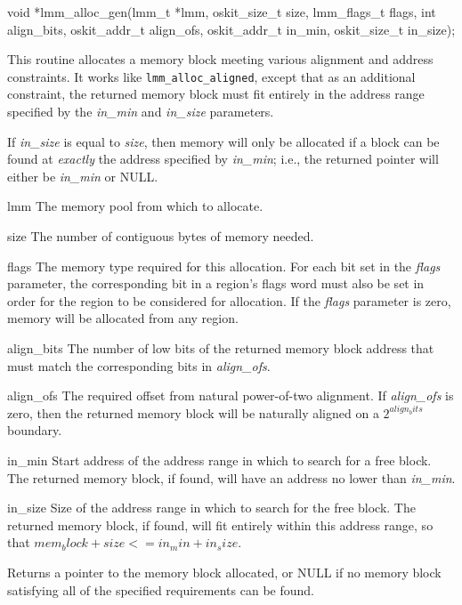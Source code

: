 \begin{apisyn}

	\funcproto void *lmm_alloc_gen(lmm_t *lmm,
		oskit_size_t size, lmm_flags_t flags,
		int align_bits, oskit_addr_t align_ofs,
		oskit_addr_t in_min, oskit_size_t in_size);
\end{apisyn}
\begin{apidesc}
	This routine allocates a memory block
	meeting various alignment and address constraints.
	It works like {\tt lmm_alloc_aligned},
	except that as an additional constraint,
	the returned memory block must fit entirely in the address range
	specified by the \emph{in_min} and \emph{in_size} parameters.

	If \emph{in_size} is equal to \emph{size},
	then memory will only be allocated
	if a block can be found at \emph{exactly} the address
	specified by \emph{in_min};
	i.e., the returned pointer will either be \emph{in_min} or NULL.
\end{apidesc}
\begin{apiparm}
	\item[lmm]
		The memory pool from which to allocate.
	\item[size]
		The number of contiguous bytes of memory needed.
	\item[flags]
		The memory type required for this allocation.
		For each bit set in the \emph{flags} parameter,
		the corresponding bit in a region's flags word must also be set
		in order for the region to be considered for allocation.
		If the \emph{flags} parameter is zero,
		memory will be allocated from any region.
	\item[align_bits]
		The number of low bits of the returned memory block address
		that must match the corresponding bits in \emph{align_ofs}.
	\item[align_ofs]
		The required offset from natural power-of-two alignment.
		If \emph{align_ofs} is zero,
		then the returned memory block will be naturally aligned
		on a $2^{align_bits}$ boundary.
	\item[in_min]
		Start address of the address range
		in which to search for a free block.
		The returned memory block, if found,
		will have an address no lower than \emph{in_min}.
	\item[in_size]
		Size of the address range in which to search for the free block.
		The returned memory block, if found,
		will fit entirely within this address range,
		so that $mem_block+size <= in_min+in_size$.
\end{apiparm}
\begin{apiret}
	Returns a pointer to the memory block allocated,
	or NULL if no memory block satisfying all of the specified requirements
	can be found.
\end{apiret}

